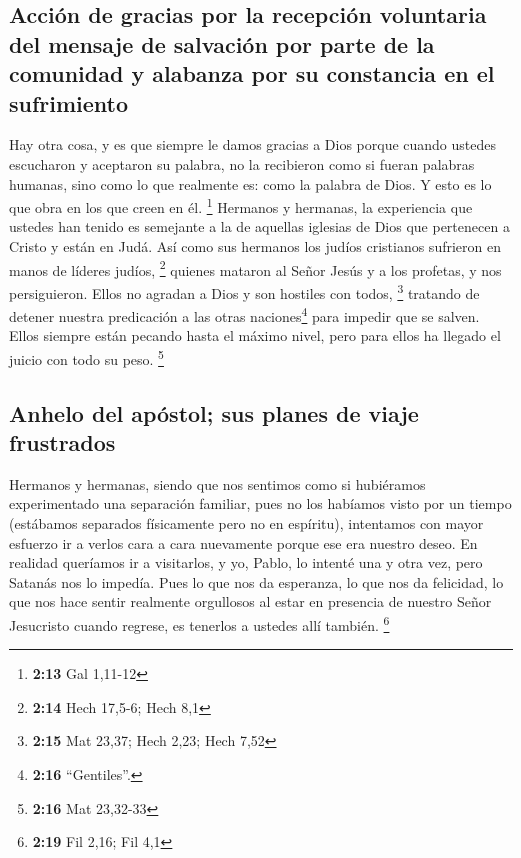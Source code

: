 \hypertarget{acciuxf3n-de-gracias-por-la-recepciuxf3n-voluntaria-del-mensaje-de-salvaciuxf3n-por-parte-de-la-comunidad-y-alabanza-por-su-constancia-en-el-sufrimiento}{%
\subsection{Acción de gracias por la recepción voluntaria del mensaje de
salvación por parte de la comunidad y alabanza por su constancia en el
sufrimiento}\label{acciuxf3n-de-gracias-por-la-recepciuxf3n-voluntaria-del-mensaje-de-salvaciuxf3n-por-parte-de-la-comunidad-y-alabanza-por-su-constancia-en-el-sufrimiento}}

 Hay otra cosa, y es que siempre le damos gracias a Dios
porque cuando ustedes escucharon y aceptaron su palabra, no la
recibieron como si fueran palabras humanas, sino como lo que realmente
es: como la palabra de Dios. Y esto es lo que obra en los que creen en
él. \footnote{\textbf{2:13} Gal 1,11-12}  Hermanos y
hermanas, la experiencia que ustedes han tenido es semejante a la de
aquellas iglesias de Dios que pertenecen a Cristo y están en Judá. Así
como sus hermanos los judíos cristianos sufrieron en manos de líderes
judíos, \footnote{\textbf{2:14} Hech 17,5-6; Hech 8,1} 
quienes mataron al Señor Jesús y a los profetas, y nos persiguieron.
Ellos no agradan a Dios y son hostiles con todos, \footnote{\textbf{2:15}
  Mat 23,37; Hech 2,23; Hech 7,52}  tratando de detener
nuestra predicación a las otras naciones\footnote{\textbf{2:16}
  ``Gentiles''.} para impedir que se salven. Ellos siempre están pecando
hasta el máximo nivel, pero para ellos ha llegado el juicio con todo su
peso. \footnote{\textbf{2:16} Mat 23,32-33}

\hypertarget{anhelo-del-apuxf3stol-sus-planes-de-viaje-frustrados}{%
\subsection{Anhelo del apóstol; sus planes de viaje
frustrados}\label{anhelo-del-apuxf3stol-sus-planes-de-viaje-frustrados}}

 Hermanos y hermanas, siendo que nos sentimos como si
hubiéramos experimentado una separación familiar, pues no los habíamos
visto por un tiempo (estábamos separados físicamente pero no en
espíritu), intentamos con mayor esfuerzo ir a verlos cara a cara
nuevamente porque ese era nuestro deseo.  En realidad
queríamos ir a visitarlos, y yo, Pablo, lo intenté una y otra vez, pero
Satanás nos lo impedía.  Pues lo que nos da esperanza, lo
que nos da felicidad, lo que nos hace sentir realmente orgullosos al
estar en presencia de nuestro Señor Jesucristo cuando regrese, es
tenerlos a ustedes allí también. \footnote{\textbf{2:19} Fil 2,16; Fil
  4,1}

